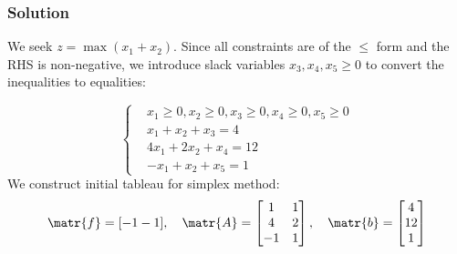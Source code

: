 \subsubsection*{Solution}
We seek $z = \max(x_1+x_2)$.
Since all constraints are of the $\leq$ form and the RHS is non-negative, we introduce slack variables $x_3, x_4, x_5 \geq 0$ to convert the inequalities to equalities:

\begin{equation*}
    \left\{
    \begin{aligned}
        &x_1 \geq 0, x_2 \geq 0, x_3 \geq 0, x_4 \geq 0, x_5 \geq 0 \\
        &x_1 + x_2 + x_3 = 4 \\
        &4x_1 + 2x_2 + x_4 = 12 \\
        &-x_1 + x_2 + x_5 = 1
    \end{aligned}
    \right.
\end{equation*}
We construct initial tableau for simplex method:
\begin{equation*}
    \matr{f}=[-1 -1],\quad \matr{A}=\begin{bmatrix}
        1 & 1\\
        4 & 2\\
        -1 & 1\\
    \end{bmatrix},\quad \matr{b}=\begin{bmatrix}
        4\\12\\1
    \end{bmatrix}
\end{equation*}

